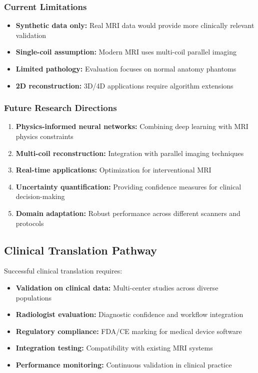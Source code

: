 \documentclass[11pt,a4paper]{article}
\begin{document}
\subsubsection{Current Limitations}

\begin{itemize}
    \item \textbf{Synthetic data only:} Real MRI data would provide more clinically relevant validation
    \item \textbf{Single-coil assumption:} Modern MRI uses multi-coil parallel imaging
    \item \textbf{Limited pathology:} Evaluation focuses on normal anatomy phantoms
    \item \textbf{2D reconstruction:} 3D/4D applications require algorithm extensions
\end{itemize}

\subsubsection{Future Research Directions}

\begin{enumerate}
    \item \textbf{Physics-informed neural networks:} Combining deep learning with MRI physics constraints
    \item \textbf{Multi-coil reconstruction:} Integration with parallel imaging techniques
    \item \textbf{Real-time applications:} Optimization for interventional MRI
    \item \textbf{Uncertainty quantification:} Providing confidence measures for clinical decision-making
    \item \textbf{Domain adaptation:} Robust performance across different scanners and protocols
\end{enumerate}

\subsection{Clinical Translation Pathway}

Successful clinical translation requires:

\begin{itemize}
    \item \textbf{Validation on clinical data:} Multi-center studies across diverse populations
    \item \textbf{Radiologist evaluation:} Diagnostic confidence and workflow integration
    \item \textbf{Regulatory compliance:} FDA/CE marking for medical device software
    \item \textbf{Integration testing:} Compatibility with existing MRI systems
    \item \textbf{Performance monitoring:} Continuous validation in clinical practice
\end{itemize}
\end{document}
